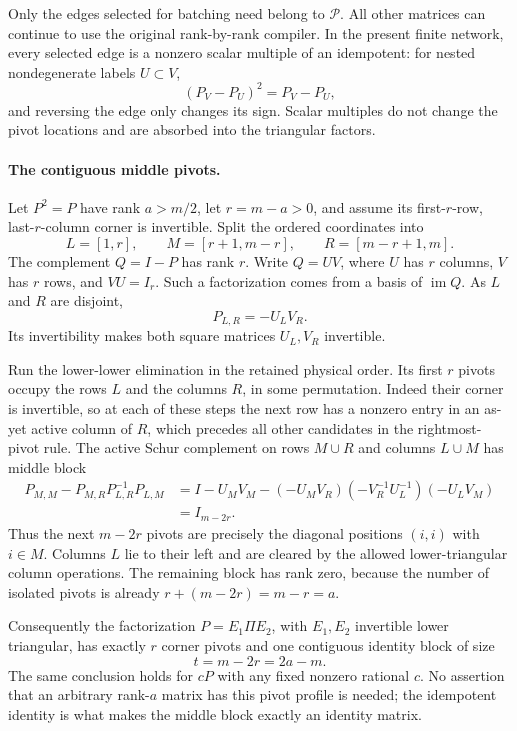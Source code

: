 Only the edges selected for batching need belong to $\mathcal P$.
All other matrices can continue to use the original rank-by-rank
compiler. In the present finite network, every selected edge is a
nonzero scalar multiple of an idempotent: for nested nondegenerate
labels $U\subset V$,
\[
 (P_V-P_U)^2=P_V-P_U,
\]
and reversing the edge only changes its sign. Scalar multiples do not
change the pivot locations and are absorbed into the triangular factors.

\paragraph{The contiguous middle pivots.}
Let $P^2=P$ have rank $a>m/2$, let $r=m-a>0$, and assume its
first-$r$-row, last-$r$-column corner is invertible. Split the ordered
coordinates into
\[
 L=[1,r],\qquad M=[r+1,m-r],\qquad R=[m-r+1,m].
\]
The complement $Q=I-P$ has rank $r$. Write $Q=UV$, where $U$ has
$r$ columns, $V$ has $r$ rows, and $VU=I_r$. Such a factorization
comes from a basis of $\operatorname{im}Q$. As $L$ and $R$ are disjoint,
\[
 P_{L,R}=-U_LV_R.
\]
Its invertibility makes both square matrices $U_L,V_R$ invertible.

Run the lower-lower elimination in the retained physical order. Its
first $r$ pivots occupy the rows $L$ and the columns $R$, in some
permutation. Indeed their corner is invertible, so at each of these
steps the next row has a nonzero entry in an as-yet active column of
$R$, which precedes all other candidates in the rightmost-pivot rule.
The active Schur complement on rows $M\cup R$ and columns $L\cup M$
has middle block
\begin{align*}
 P_{M,M}-P_{M,R}P_{L,R}^{-1}P_{L,M}
 &=I-U_MV_M
   -(-U_MV_R)(-V_R^{-1}U_L^{-1})(-U_LV_M)\\
 &=I_{m-2r}.
\end{align*}
Thus the next $m-2r$ pivots are precisely the diagonal positions
$(i,i)$ with $i\in M$. Columns $L$ lie to their left and are cleared
by the allowed lower-triangular column operations. The remaining
block has rank zero, because the number of isolated pivots is already
$r+(m-2r)=m-r=a$.

Consequently the factorization $P=E_1\Pi E_2$, with $E_1,E_2$
invertible lower triangular, has exactly $r$ corner pivots and one
contiguous identity block of size
\[
 t=m-2r=2a-m.
\]
The same conclusion holds for $cP$ with any fixed nonzero rational $c$.
No assertion that an arbitrary rank-$a$ matrix has this pivot profile
is needed; the idempotent identity is what makes the middle block
exactly an identity matrix.

